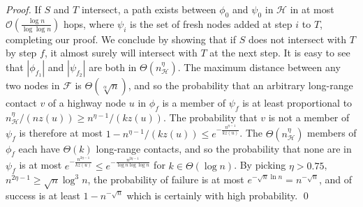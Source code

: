 \begin{proof}
    If $S$ and $T$ intersect, a path exists between
    $\phi_0$ and $\psi_0$ in $\mathcal{H}$ in at most
    $\mathcal{O}(\frac{\log{n}}{\log{\log{n}}})$ hops, where $\psi_i$ is the
    set of fresh nodes added at step $i$ to $T$, completing our proof.
    We conclude by showing that if $S$ does not intersect with $T$ by
    step $f$, it almost surely will intersect with $T$ at the next step.
    It is easy to see that $|\phi_{f_1}|$ and $|\psi_{f_2}|$
    are both in $\Theta(n_\mathcal{H}^\eta)$.
    The maximum distance between any two nodes in $\mathcal{F}$ is
    $\Theta(\sqrt[\alpha]{n})$, and so the probability that an arbitrary
    long-range contact $v$ of a highway node $u$ in $\phi_f$ is a
    member of $\psi_f$ is at least proportional to $n_\mathcal{H}^\eta/(n
    z(u)) \geq n^{\eta - 1}/(k z(u))$.
    The probability that $v$ is not a member of $\psi_f$ is therefore at most
    $1 - n^{\eta - 1}/(k z(u)) \leq e^{-\frac{n^{\eta - 1}}{k z(u)}}$.
    The $\Theta(n_\mathcal{H}^\eta)$ members of $\phi_f$ each have $\Theta(k)$
    long-range contacts, and so the probability that none are in
    $\psi_f$ is at most $e^{-\frac{n^{2 \eta - 1}}{k z(u)}} \leq
    e^{-\frac{n^{2 \eta - 1}}{\log{n} \log{\log{n}}}}$ 
    for $k \in
    \Theta(\log{n})$.
    By picking $\eta > 0.75$, $n^{2 \eta - 1} \geq \sqrt{n}\log^3{n}$,
    the probability of failure is at most $e^{-\sqrt{n} \ln{n}} =
    n^{-\sqrt{n}}$, and of success is at least $1 -
    n^{-\sqrt{n}}$ which is certainly with high probability.
    \qed
\end{proof}

